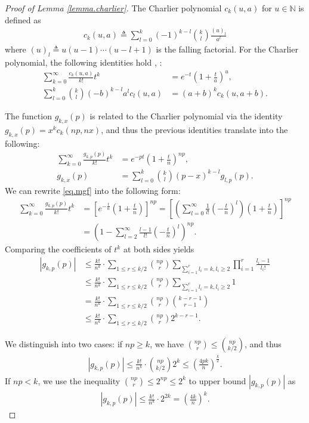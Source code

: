 \documentclass[final,12pt]{colt2018} %
\begin{document}
\begin{proof}[Proof of Lemma \ref{lemma.charlier}]
	The Charlier polynomial $c_k(u,a)$ for $u\in \mathbb{N}$ is defined as
	\begin{align*}
	c_k(u,a) \triangleq \sum_{l=0}^k (-1)^{k-l}\binom{k}{l}\frac{(u)_l}{a^l}
	\end{align*}
	where $(u)_l\triangleq u(u-1)\cdots(u-l+1)$ is the falling factorial. For the Charlier polynomial, the following identities hold \cite{peccati2011some}, \cite[Eqn. (574)]{jiao2017minimax}:
	\begin{align*}
	\sum_{k=0}^\infty \frac{c_k(u,a)}{k!}t^k &= e^{-t}\left(1+\frac{t}{a}\right)^u, \\
	\sum_{l=0}^k \binom{k}{l}(-b)^{k-l}a^lc_l(u,a)&=(a+b)^kc_k(u,a+b).
	\end{align*}
	
	The function $g_{k,x}(p)$ is related to the Charlier polynomial via the identity $g_{k,x}(p)=x^kc_k(np,nx)$, and thus the previous identities translate into the following:
	\begin{align}
	\sum_{k=0}^\infty \frac{g_{k,p}(p)}{k!}t^k &= e^{-pt}(1+\frac{t}{n})^{np}, \label{eq.mgf} \\
	g_{k,x}(p) &= \sum_{l=0}^k \binom{k}{l}(p-x)^{k-l}g_{l,p}(p). \label{eq.sum_rule}
	\end{align}
	We can rewrite \eqref{eq.mgf} into the following form:
	\begin{align*}
	\sum_{k=0}^\infty \frac{g_{k,p}(p)}{k!}t^k &= \left[e^{-\frac{t}{n}}\left(1+\frac{t}{n}\right)\right]^{np} = \left[\left(\sum_{l=0}^\infty \frac{1}{l!}(-\frac{t}{n})^l\right)\left(1+\frac{t}{n}\right)\right]^{np}\\
	&=\left(1-\sum_{l=2}^\infty \frac{l-1}{l!}(-\frac{t}{n})^l\right)^{np}.
	\end{align*}
	Comparing the coefficients of $t^k$ at both sides yields
	\begin{align*}
	|g_{k,p}(p)| &\le \frac{k!}{n^k}\cdot \sum_{1\le r\le k/2}\binom{np}{r}\sum_{\sum_{i=1}^r l_i=k, l_i\ge 2}  \prod_{i=1}^r\frac{l_i-1}{l_i!} \\
	&\le \frac{k!}{n^k}\cdot \sum_{1\le r\le k/2}\binom{np}{r}\sum_{\sum_{i=1}^r l_i=k, l_i\ge 2}  1 \\
	&= \frac{k!}{n^k}\cdot \sum_{1\le r\le k/2}\binom{np}{r} \binom{k-r-1}{r-1} \\
	&\le \frac{k!}{n^k}\cdot \sum_{1\le r\le k/2}\binom{np}{r}2^{k-r-1}.
	\end{align*}
	
	We distinguish into two cases: if $np\ge k$, we have $\binom{np}{r}\le \binom{np}{k/2}$, and thus
	\begin{align*}
	|g_{k,p}(p)| \le \frac{k!}{n^k}\cdot\binom{np}{k/2}2^k \le \left(\frac{4pk}{n}\right)^{\frac{k}{2}}.
	\end{align*}
	If $np<k$, we use the inequality $\binom{np}{r}\le 2^{np}\le 2^k$ to upper bound $|g_{k,p}(p)|$ as
	\begin{align*}
	|g_{k,p}(p)| \le \frac{k!}{n^k}\cdot 2^{2k} = \left(\frac{4k}{n}\right)^k.
	\end{align*}
	

\end{proof}
\end{document}
